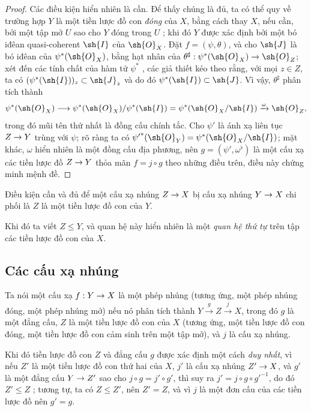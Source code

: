 \documentclass[oneside]{amsart}
\makeatletter
\renewcommand{\leq}{\leqslant}
\newcommand{\ega@arrow}[2]{\mathchoice{#1}{#2}{#2}{#2}}
\renewcommand{\to}{\ega@arrow{\longrightarrow}{\rightarrow}}
\newcommand{\oldpage}[2][]{{\marginnote{\normalfont\textbf{#1}~|~#2}}\ignorespaces}
\let\EGAOriginalLabel\label
\renewcommand{\label}[1]{\phantomsection\EGAOriginalLabel{#1}}
\makeatother
\begin{document}
\begin{proof}
Các điều kiện hiển nhiên là cần.
Để thấy chúng là đủ, ta có thể quy về trường hợp $Y$ là một tiền lược đồ con \emph{đóng} của $X$, bằng cách thay $X$, nếu cần, bởi một tập mở $U$ sao cho $Y$ đóng trong $U$ ;
khi đó $Y$ được xác định bởi một bó iđêan quasi-coherent $\sh{I}$ của $\sh{O}_X$.
Đặt $f=(\psi,\theta)$, và cho $\sh{J}$ là bó iđêan của $\psi^*(\sh{O}_X)$, bằng hạt nhân của $\theta^\sharp:\psi^*(\sh{O}_X)\to\sh{O}_Z$;
xét đến các tính chất của hàm tử $\psi^*$ , các giả thiết kéo theo rằng, với mọi $z\in Z$, ta có $(\psi^*(\sh{I}))_z\subset\sh{J}_z$ và do đó $\psi^*(\sh{I})\subset\sh{J}$.
Vì vậy, $\theta^\sharp$ phân tích thành
\[
  \psi^*(\sh{O}_X)\to\psi^*(\sh{O}_X)/\psi^*(\sh{I})=\psi^*(\sh{O}_X/\sh{I})\xrightarrow{\omega}\sh{O}_Z,
\]
trong đó mũi tên thứ nhất là đồng cấu chính tắc.
Cho $\psi'$ là ánh xạ liên tục $Z\to Y$ trùng với $\psi$;
rõ ràng ta có ${\psi'}^*(\sh{O}_Y)=\psi^*(\sh{O}_X/\sh{I})$;
mặt khác, $\omega$ hiển nhiên là một đồng cấu địa phương, nên $g=(\psi',\omega^\flat)$ là một cấu xạ
\oldpage[I]{122}
các tiền lược đồ $Z\to Y$  thỏa mãn $f=j\circ g$ theo những điều trên, điều này chứng minh mệnh đề.
\end{proof}

\begin{corollary}[4.1.10]
\label{I.4.1.10}
Điều kiện cần và đủ để một cấu xạ nhúng $Z\to X$ bị cấu xạ nhúng $Y\to X$ chi phối là $Z$ là một tiền lược đồ con của $Y$.
\end{corollary}

Khi đó ta viết $Z\leq Y$, và quan hệ này hiển nhiên là một \emph{quan hệ thứ tự} trên tập các tiền lược đồ con của $X$.

\subsection{Các cấu xạ nhúng}
\label{subsection:I.4.2}

\begin{definition}[4.2.1]
\label{I.4.2.1}
Ta nói một cấu xạ $f:Y\to X$ là một phép nhúng (tương ứng, một phép nhúng đóng, một phép nhúng mở) nếu nó phân tích thành $Y\xrightarrow{g}Z\xrightarrow{j}X$, trong đó $g$ là một đẳng cấu, $Z$ là một tiền lược đồ con của $X$ (tương ứng, một tiền lược đồ con đóng, một tiền lược đồ con cảm sinh trên một tập mở), và $j$ là cấu xạ nhúng.
\end{definition}

Khi đó tiền lược đồ con $Z$ và đẳng cấu $g$ được xác định một cách \emph{duy nhất}, vì nếu $Z'$ là một tiền lược đồ con thứ hai của $X$, $j'$ là cấu xạ nhúng $Z'\to X$, và $g'$ là một đẳng cấu $Y\to Z'$ sao cho $j\circ g=j'\circ g'$, thì suy ra $j'=j\circ g\circ{g'}^{-1}$, do đó $Z'\leq Z$ ; tương tự, ta có $Z\leq Z'$, nên $Z'=Z$, và vì $j$ là một đơn cấu của các tiền lược đồ nên $g'=g$.
\end{document}
